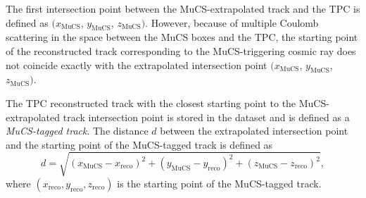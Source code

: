 \documentclass[a4paper,11pt]{article}
\begin{document}
The first intersection point between the MuCS-extrapolated track and the TPC is defined as $(x_{\mathrm{MuCS}}$, $y_{\mathrm{MuCS}}$, $z_{\mathrm{MuCS}})$. However, because of multiple Coulomb scattering in the space between the MuCS boxes and the TPC, the starting point of the reconstructed track corresponding to the MuCS-triggering cosmic ray does not coincide exactly with the extrapolated intersection point $(x_{\mathrm{MuCS}}$, $y_{\mathrm{MuCS}}$, $z_{\mathrm{MuCS}})$.

The TPC reconstructed track with the closest starting point to the MuCS-extrapolated track intersection point is stored in the dataset and is defined as a \emph{MuCS-tagged track}.
The distance $d$ between the extrapolated intersection point and the starting point of the MuCS-tagged track is defined as
\begin{equation}\label{eq:d}
d = \sqrt{(x_{\mathrm{MuCS}}-x_{\mathrm{reco}})^2+(y_{\mathrm{MuCS}}-y_{\mathrm{reco}})^2+(z_{\mathrm{MuCS}}-z_{\mathrm{reco}})^2},
\end{equation}
where $(x_{\mathrm{reco}},y_{\mathrm{reco}},z_{\mathrm{reco}})$ is the starting point of the MuCS-tagged track.
\end{document}
